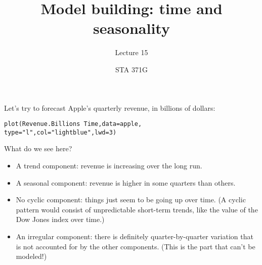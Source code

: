 \documentclass{beamer}\usepackage[]{graphicx}\usepackage[]{color}
\title{Model building: time and seasonality}
\subtitle{Lecture 15}
\author{STA 371G}
\makeatletter
\newcommand{\hlnum}[1]{\textcolor[rgb]{0.824,0.412,0.118}{#1}}%
\newcommand{\hlstr}[1]{\textcolor[rgb]{1,0.894,0.71}{#1}}%
\newcommand{\hlopt}[1]{\textcolor[rgb]{1,0.894,0.769}{#1}}%
\newcommand{\hlstd}[1]{\textcolor[rgb]{1,0.894,0.769}{#1}}%
\newcommand{\hlkwc}[1]{\textcolor[rgb]{0.78,0.941,0.545}{#1}}%
\newcommand{\hlkwd}[1]{\textcolor[rgb]{1,0.78,0.769}{#1}}%
\newenvironment{kframe}{%
 \def\at@end@of@kframe{}%
 \ifinner\ifhmode%
  \def\at@end@of@kframe{\end{minipage}}%
  \begin{minipage}{\columnwidth}%
 \fi\fi%
 \def\FrameCommand##1{\hskip\@totalleftmargin \hskip-\fboxsep
 \colorbox{shadecolor}{##1}\hskip-\fboxsep
     \hskip-\linewidth \hskip-\@totalleftmargin \hskip\columnwidth}%
 \MakeFramed {\advance\hsize-\width
   \@totalleftmargin\z@ \linewidth\hsize
   \@setminipage}}%
 {\par\unskip\endMakeFramed%
 \at@end@of@kframe}
\newenvironment{knitrout}{}{} %
\makeatother
\begin{document}
  
  

  \frame{\maketitle}



  \begin{darkframes}
    \begin{frame}[fragile]
      \fontsm
      Let's try to forecast Apple's quarterly revenue, in billions of dollars:
\begin{knitrout}
\begin{kframe}
\begin{alltt}
\hlkwd{plot}\hlstd{(Revenue.Billions} \hlopt{~} \hlstd{Time,} \hlkwc{data}\hlstd{=apple,}
  \hlkwc{type}\hlstd{=}\hlstr{"l"}\hlstd{,} \hlkwc{col}\hlstd{=}\hlstr{"lightblue"}\hlstd{,} \hlkwc{lwd}\hlstd{=}\hlnum{3}\hlstd{)}
\end{alltt}
\end{kframe}


\end{knitrout}
    \end{frame}

    \begin{frame}
      What do we see here?
      \begin{itemize}[<+->]
        \item \greencheckmark A \alert{trend} component: revenue is increasing over the long run.
        \item \greencheckmark A \alert{seasonal} component: revenue is higher in some quarters than others.
        \item \redx No \alert{cyclic} component: things just seem to be going up over time. (A cyclic pattern would consist of unpredictable short-term trends, like the value of the Dow Jones index over time.)
        \item \greencheckmark An \alert{irregular} component: there is definitely quarter-by-quarter variation that is not accounted for by the other components. (This is the part that can't be modeled!)
      \end{itemize}
    \end{frame}


\end{darkframes}
\end{document}
